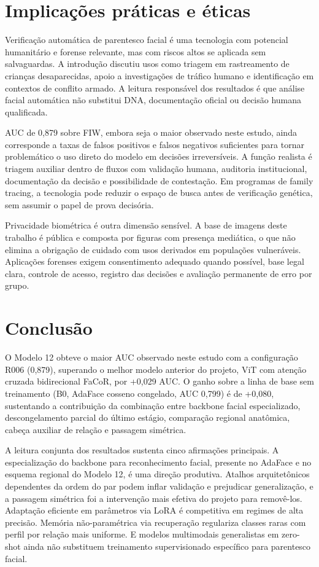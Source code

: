 \section{Implicações práticas e éticas}

Verificação automática de parentesco facial é uma tecnologia com potencial humanitário e forense relevante, mas com riscos altos se aplicada sem salvaguardas. A introdução discutiu usos como triagem em rastreamento de crianças desaparecidas, apoio a investigações de tráfico humano e identificação em contextos de conflito armado. A leitura responsável dos resultados é que análise facial automática não substitui DNA, documentação oficial ou decisão humana qualificada.

AUC de 0,879 sobre FIW, embora seja o maior observado neste estudo, ainda corresponde a taxas de falsos positivos e falsos negativos suficientes para tornar problemático o uso direto do modelo em decisões irreversíveis. A função realista é triagem auxiliar dentro de fluxos com validação humana, auditoria institucional, documentação da decisão e possibilidade de contestação. Em programas de family tracing, a tecnologia pode reduzir o espaço de busca antes de verificação genética, sem assumir o papel de prova decisória.

Privacidade biométrica é outra dimensão sensível. A base de imagens deste trabalho é pública e composta por figuras com presença mediática, o que não elimina a obrigação de cuidado com usos derivados em populações vulneráveis. Aplicações forenses exigem consentimento adequado quando possível, base legal clara, controle de acesso, registro das decisões e avaliação permanente de erro por grupo.

\section{Conclusão}

O Modelo 12 obteve o maior AUC observado neste estudo com a configuração R006 (0,879), superando o melhor modelo anterior do projeto, ViT com atenção cruzada bidirecional FaCoR, por +0,029 AUC. O ganho sobre a linha de base sem treinamento (B0, AdaFace cosseno congelado, AUC 0,799) é de +0,080, sustentando a contribuição da combinação entre backbone facial especializado, descongelamento parcial do último estágio, comparação regional anatômica, cabeça auxiliar de relação e passagem simétrica.

A leitura conjunta dos resultados sustenta cinco afirmações principais. A especialização do backbone para reconhecimento facial, presente no AdaFace e no esquema regional do Modelo 12, é uma direção produtiva. Atalhos arquitetônicos dependentes da ordem do par podem inflar validação e prejudicar generalização, e a passagem simétrica foi a intervenção mais efetiva do projeto para removê-los. Adaptação eficiente em parâmetros via LoRA é competitiva em regimes de alta precisão. Memória não-paramétrica via recuperação regulariza classes raras com perfil por relação mais uniforme. E modelos multimodais generalistas em zero-shot ainda não substituem treinamento supervisionado específico para parentesco facial.


